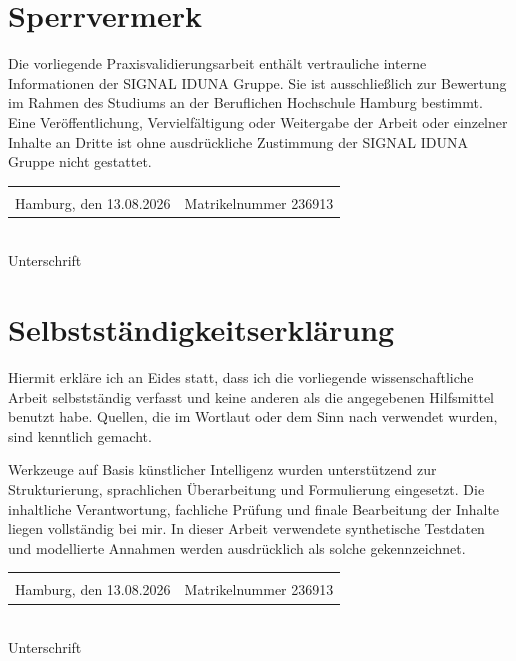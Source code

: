 \documentclass[
  10pt,
  ngerman,
  a4paper,
  toc=graduated,
  numbers=noenddot,
  headings=standardclasses,
  nonumberlist
]{scrartcl}
\begin{document}
\newpage
{}
{}
\section*{Sperrvermerk}
Die vorliegende Praxisvalidierungsarbeit enthält vertrauliche interne Informationen der SIGNAL IDUNA Gruppe. Sie ist ausschließlich zur Bewertung im Rahmen des Studiums an der Beruflichen Hochschule Hamburg bestimmt. Eine Veröffentlichung, Vervielfältigung oder Weitergabe der Arbeit oder einzelner Inhalte an Dritte ist ohne ausdrückliche Zustimmung der SIGNAL IDUNA Gruppe nicht gestattet.

\vspace{2cm}
\begin{tabular}{@{}p{6cm}p{6cm}@{}}
\hrulefill & \hrulefill\\
Hamburg, den 13.08.2026 & Matrikelnummer 236913
\end{tabular}

\vspace{2cm}
\hrulefill\\
Unterschrift

\newpage
{}
{}
\section*{Selbstständigkeitserklärung}
Hiermit erkläre ich an Eides statt, dass ich die vorliegende wissenschaftliche Arbeit selbstständig verfasst und keine anderen als die angegebenen Hilfsmittel benutzt habe. Quellen, die im Wortlaut oder dem Sinn nach verwendet wurden, sind kenntlich gemacht.

Werkzeuge auf Basis künstlicher Intelligenz wurden unterstützend zur Strukturierung, sprachlichen Überarbeitung und Formulierung eingesetzt. Die inhaltliche Verantwortung, fachliche Prüfung und finale Bearbeitung der Inhalte liegen vollständig bei mir. In dieser Arbeit verwendete synthetische Testdaten und modellierte Annahmen werden ausdrücklich als solche gekennzeichnet.

\vspace{2cm}
\begin{tabular}{@{}p{6cm}p{6cm}@{}}
\hrulefill & \hrulefill\\
Hamburg, den 13.08.2026 & Matrikelnummer 236913
\end{tabular}

\vspace{2cm}
\hrulefill\\
Unterschrift
\end{document}
